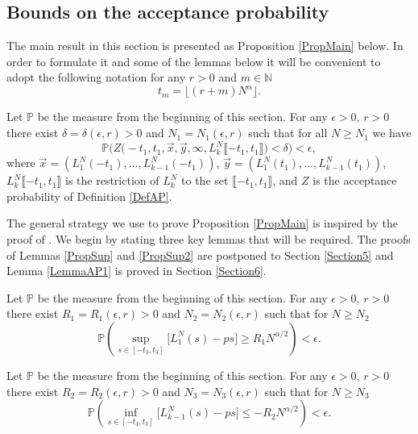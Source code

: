 \subsection{Bounds on the acceptance probability}\label{Section4.1}
The main result in this section is presented as Proposition \ref{PropMain} below. In order to formulate it and some of the lemmas below it will be convenient to adopt the following notation for any $r > 0$ and $m \in \mathbb{N}$
\begin{equation}\label{eqsts}
t_m =\lfloor (r+m) N^{\alpha} \rfloor.
\end{equation}
\begin{proposition}\label{PropMain} Let $\mathbb{P}$ be the measure from the beginning of this section. For any $\epsilon > 0$, $r > 0$ there exist $\delta = \delta(\epsilon, r) > 0$ and $N_1 = N_1(\epsilon, r)$ such that for all $N \geq N_1$
	we have 
	$$\mathbb{P}\Big(Z\big( -t_1, t_1, \vec{x}, \vec{y} , \infty,  L^N_{k}\llbracket -t_1, t_1\rrbracket\big) < \delta\Big) < \epsilon,$$
	where $\vec{x} = (L_1^N(-t_1), \dots, L_{k-1}^N(-t_1))$, $\vec{y} = (L_1^N(t_1), \dots, L^N_{k-1}(t_1))$,  $ L^N_{k}\llbracket -t_1, t_1\rrbracket$ is the restriction of $L^N_k$ to the set $\llbracket -t_1, t_1\rrbracket$, and $Z$ is the acceptance probability of Definition \ref{DefAP}. 
\end{proposition}

The general strategy we use to prove Proposition \ref{PropMain} is inspired by the proof of \cite[Proposition 6.5]{CorHamK}. We begin by stating three key lemmas that will be required. The proofs of Lemmas \ref{PropSup} and \ref{PropSup2} are postponed to Section \ref{Section5} and Lemma \ref{LemmaAP1} is proved in Section \ref{Section6}.


\begin{lemma}\label{PropSup}  Let $\mathbb{P}$ be the measure from the beginning of this section. For any $\epsilon > 0$, $r > 0$ there exist $R_1=R_1(\epsilon,r) > 0$ and $N_2= N_2(\epsilon,r)$ such that for $N \geq N_2$ 
	$$\mathbb{P} \left( \sup_{s \in [ -t_3, t_3] }\big[ L^N_1(s) - p s \big] \geq  R_1N^{\alpha/2} \right) < \epsilon.$$
\end{lemma}

\begin{lemma}\label{PropSup2}  Let $\mathbb{P}$ be the measure from the beginning of this section.  For any $\epsilon > 0$, $r > 0$ there exist $R_2=R_2( \epsilon,r) > 0$ and $N_3=N_3(\epsilon,r)$ such that for $N \geq N_3$
	$$\mathbb{P}\left( \inf_{s \in [ -t_3, t_3 ]}\big[L^N_{k-1}(s) - p s \big] \leq - R_2N^{\alpha/2} \right) < \epsilon.$$
\end{lemma}

